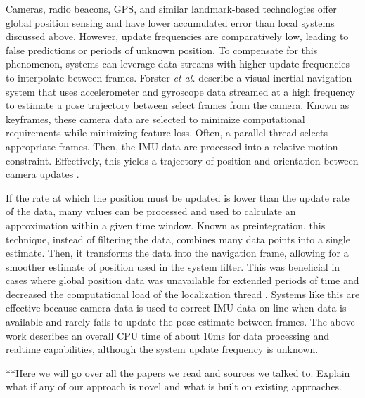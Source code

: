 \documentclass{article}
\begin{document}
	Cameras, radio beacons, GPS, and similar landmark-based technologies offer global position sensing and have lower accumulated error than local systems discussed above. However, update frequencies are comparatively low, leading to false predictions or periods of unknown position. To compensate for this phenomenon, systems can leverage data streams with higher update frequencies to interpolate between frames. Forster \textit{et al.} describe a visual-inertial navigation system that uses accelerometer and gyroscope data streamed at a high frequency to estimate a pose trajectory between select frames from the camera. Known as keyframes, these camera data are selected to minimize computational requirements while minimizing feature loss. Often, a parallel thread selects appropriate frames. Then, the IMU data are processed into a relative motion constraint. Effectively, this yields a trajectory of position and orientation between camera updates \cite{forster_CDS_15}.

    If the rate at which the position must be updated is lower than the update rate of the data, many values can be processed and used to calculate an approximation within a given time window. Known as preintegration, this technique, instead of filtering the data, combines many data points into a single estimate. Then, it transforms the data into the navigation frame, allowing for a smoother estimate of position used in the system filter. This was beneficial in cases where global position data was unavailable for extended periods of time and decreased the computational load of the localization thread \cite{lupton_vian_2012}. Systems like this are effective because camera data is used to correct IMU data on-line when data is available and rarely fails to update the pose estimate between frames. The above work describes an overall CPU time of about 10ms for data processing and realtime capabilities, although the system update frequency is unknown.



**Here we will go over all the papers we read and sources we talked to. Explain what if any of our approach is novel and what is built on existing approaches.
\end{document}
